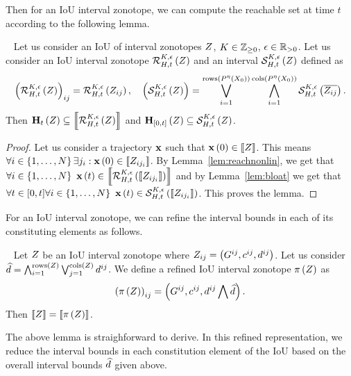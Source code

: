 %
Then for an IoU interval zonotope, we can compute the reachable
set at time $t$ according to the following lemma.
%
\begin{lemma}~\label{lem:ioureach}
Let us consider an IoU of interval zonotopes $Z$,
$K\in\mathbb{Z}_{\geq 0}$, $\epsilon\in\mathbb{R}_{>0}$.  Let us consider
an IoU interval zonotope $\mathcal{R}_{H,t}^{K,\epsilon}\left(Z\right)$ and an
interval $\mathcal{S}_{H,t}^{K,\epsilon}\left(Z\right)$ defined as
%
\begin{align*}
\left(\mathcal{R}_{H,t}^{K,\epsilon}\left(Z\right)\right)_{ij}
= \mathcal{R}_{H,t}^{K,\epsilon}\left(Z_{ij}\right),~~~
\left(\mathcal{S}_{H,t}^{K,\epsilon}\left(Z\right)\right)
= \bigvee_{i=1}^{\operatorname{rows}\left(P^{\eta}\left(X_0\right)\right)}\bigwedge_{i=1}^{\operatorname{cols}\left(P^{\eta}\left(X_0\right)\right)}\mathcal{S}_{H,t}^{K,\epsilon}\left(\overline{Z_{ij}}\right).
\end{align*}
%
Then
$\mathbf{H}_{t}\left(Z\right)\subseteq \left\llbracket{\mathcal{R}_{H,t}^{K,\epsilon}\left(Z\right)}\right\rrbracket$ and
$\mathbf{H}_{[0,t]}\left(Z\right)\subseteq \mathcal{S}_{H,t}^{K,\epsilon}\left(Z\right)$.
\end{lemma}
%
\begin{proof}
Let us consider a trajectory $\mathbf{x}$ such that $\mathbf{x}\left(0\right)\in\left\llbracket{Z}\right\rrbracket$.
This means $\forall i\in\left\{1,\ldots,N\right\} \exists
j_i:\mathbf{x}\left(0\right)\in\left\llbracket{Z_{ij_i}}\right\rrbracket$.  By Lemma~\ref{lem:reachnonlin}, we get
that $\forall
i\in\left\{1,\ldots,N\right\}~\mathbf{x}\left(t\right)\in\left\llbracket{\mathcal{R}_{H,t}^{K,\epsilon}\left(\left\llbracket{Z_{ij_i}}\right\rrbracket\right)}\right\rrbracket$
and by Lemma~\ref{lem:bloat} we get that $\forall t\in[0,t]\forall
i\in\left\{1,\ldots,N\right\}~\mathbf{x}\left(t\right)\in\mathcal{S}_{H,t}^{K,\epsilon}\left(\left\llbracket{Z_{ij_i}}\right\rrbracket\right)$.
This proves the lemma.
\end{proof}
%
For an IoU interval zonotope, we can refine the interval bounds in
each of its constituting elements as follows. 
%
\begin{lemma}~\label{lem:refine}
Let $Z$ be an IoU interval zonotope where $Z_{ij}
= \left(G^{ij},c^{ij},d^{ij}\right)$.  Let us consider $\widehat{d}
= \bigwedge_{i=1}^{\operatorname{rows}\left(Z\right)}\bigvee_{j=1}^{\operatorname{cols}\left(Z\right)}d^{ij}$.  We
define a refined IoU interval zonotope $\operatorname*{\pi}\left(Z\right)$ as
%
\[
\left(\operatorname*{\pi}\left(Z\right)\right)_{ij}
= \left(G^{ij},{c^{ij}},{d^{ij}\bigwedge \widehat{d}}\right).
\]
%
Then $\left\llbracket{Z}\right\rrbracket = \left\llbracket{\operatorname*{\pi}\left(Z\right)}\right\rrbracket$.
\end{lemma}
%
The above lemma is straighforward to derive.  In this refined
representation, we reduce the interval bounds in each constitution
element of the IoU based on the overall interval bounds $\widehat{d}$
given above.

